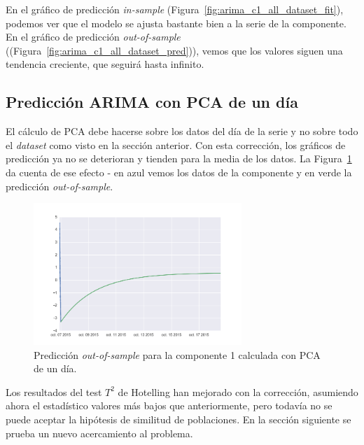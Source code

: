 \documentclass[11pt,spanish,listoffigures,listoftables]{tfgetsinf}
\begin{document}
        En el gráfico de predicción {\em in-sample} (Figura~\ref{fig:arima_c1_all_dataset_fit}), podemos ver que el modelo se ajusta bastante bien a la serie de la componente. En el gráfico de predicción {\em out-of-sample} ((Figura~\ref{fig:arima_c1_all_dataset_pred})), vemos que los valores siguen una tendencia creciente, que seguirá hasta infinito. 
        
        \subsection{Predicción ARIMA con PCA de un día}
        El cálculo de PCA debe hacerse sobre los datos del día de la serie y no sobre todo el {\em dataset} como visto en la sección anterior. Con esta corrección, los gráficos de predicción ya no se deterioran y tienden para la media de los datos. La  Figura~\ref{fig:arima_c1_one_day_pred} da cuenta de ese efecto - en azul vemos los datos de la componente y en verde la predicción {\em out-of-sample}.
        
        \begin{figure}[H]
            \centering
            \includegraphics[width=0.7\textwidth]{arima_c1_one_day_pred.png}
            \caption{Predicción {\em out-of-sample} para la componente 1 calculada con PCA de un día.}
            \label{fig:arima_c1_one_day_pred}
        \end{figure}
        
        Los resultados del test \(T^2\) de Hotelling han mejorado con la corrección, asumiendo ahora el estadístico valores más bajos que anteriormente, pero todavía no se puede aceptar la hipótesis de similitud de poblaciones. En la sección siguiente se prueba un nuevo acercamiento al problema.
        
\end{document}
